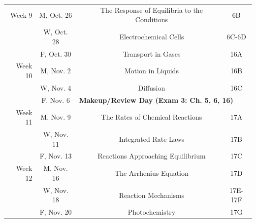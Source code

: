 \begin{tabular}{rcccc}
	\midrule
	Week 9      & M, Oct. 26 &                                                                                             & The Response of Equilibria to the Conditions & 6B      \\
	            & W, Oct. 28 &                                                                                             & Electrochemical Cells                        & 6C-6D   \\
	            & F, Oct. 30 &                                                                                             & Transport in Gases                           & 16A     \\
	\midrule
	Week 10     & M, Nov. 2  &                                                                                             & Motion in Liquids                            & 16B     \\
	            & W, Nov. 4  &                                                                                             & Diffusion                                    & 16C     \\
	            & F, Nov. 6  & \multicolumn{3}{l}{\textbf{Makeup/Review Day (Exam 3: Ch. 5, 6, 16)}}                                                                                \\
	\midrule
	Week 11     & M, Nov. 9  &                                                                                             & The Rates of Chemical Reactions              & 17A     \\
	            & W, Nov. 11 &                                                                                             & Integrated Rate Laws                         & 17B     \\
	            & F, Nov. 13 &                                                                                             & Reactions Approaching Equilibrium            & 17C     \\
	\midrule
	Week 12     & M, Nov. 16 &                                                                                             & The Arrhenius Equation                       & 17D     \\
	            & W, Nov. 18 &                                                                                             & Reaction Mechanisms                          & 17E-17F \\
	            & F, Nov. 20 &                                                                                             & Photochemistry                               & 17G     \\

\end{tabular}
